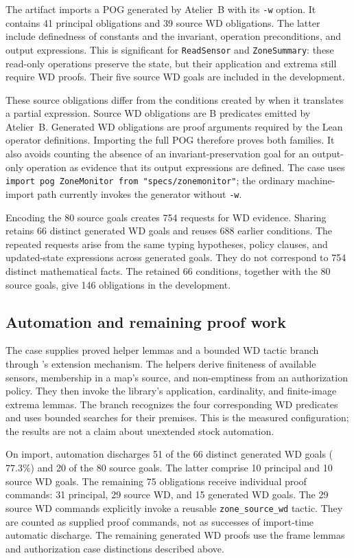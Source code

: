 The artifact imports a POG generated by Atelier~B with its \texttt{-w}
option. It contains 41 principal obligations and 39 source WD obligations.
The latter include definedness of constants and the invariant, operation
preconditions, and output expressions. This is significant for
\texttt{ReadSensor} and \texttt{ZoneSummary}: these read-only operations
preserve the state, but their application and extrema still require WD
proofs. Their five source WD goals are included in the development.

These source obligations differ from the conditions created by \barrel
when it translates a partial expression. Source WD obligations are B
predicates emitted by Atelier~B. Generated WD obligations are proof
arguments required by the Lean operator definitions. Importing the full
POG therefore proves both families. It also avoids counting the absence
of an invariant-preservation goal for an output-only operation as evidence
that its output expressions are defined. The case uses
\texttt{import pog ZoneMonitor from "specs/zonemonitor"}; the ordinary
machine-import path currently invokes the generator without \texttt{-w}.

Encoding the 80 source goals creates 754 requests for WD evidence.
Sharing retains 66 distinct generated WD goals and reuses 688 earlier
conditions. The repeated requests arise from the same typing hypotheses,
policy clauses, and updated-state expressions across generated goals.
They do not correspond to 754 distinct mathematical facts. The retained
66 conditions, together with the 80 source goals, give 146 obligations
in the \barrel development.

\subsection{Automation and remaining proof work}

The case supplies proved helper lemmas and a bounded WD tactic branch
through \barrel's extension mechanism. The helpers derive finiteness of
available sensors, membership in a map's source, and non-emptiness from
an authorization policy. They then invoke the library's application,
cardinality, and finite-image extrema lemmas. The branch recognizes the
four corresponding WD predicates and uses bounded searches for their
premises. This is the measured configuration; the results are not a claim
about unextended stock automation.

On import, automation discharges 51 of the 66 distinct generated WD goals
($77.3\%$) and 20 of the 80 source goals. The latter comprise 10 principal
and 10 source WD goals. The remaining 75 obligations receive individual
proof commands: 31 principal, 29 source WD, and 15 generated WD goals.
The 29 source WD commands explicitly invoke a reusable
\texttt{zone\_source\_wd} tactic. They are counted as supplied proof
commands, not as successes of import-time automatic discharge. The
remaining generated WD proofs use the frame lemmas and authorization
case distinctions described above.


